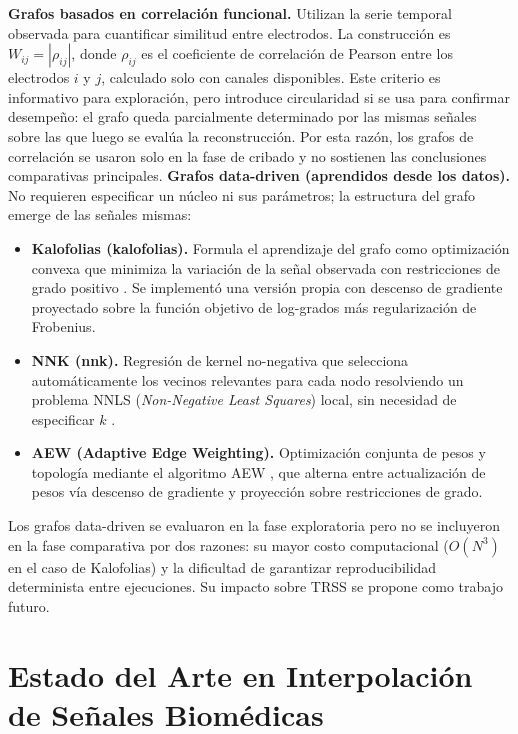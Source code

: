 \textbf{Grafos basados en correlación funcional.} Utilizan la serie temporal observada para cuantificar similitud entre electrodos. La construcción es $W_{ij} = |\rho_{ij}|$, donde $\rho_{ij}$ es el coeficiente de correlación de Pearson entre los electrodos $i$ y $j$, calculado solo con canales disponibles. Este criterio es informativo para exploración, pero introduce circularidad si se usa para confirmar desempeño: el grafo queda parcialmente determinado por las mismas señales sobre las que luego se evalúa la reconstrucción. Por esta razón, los grafos de correlación se usaron solo en la fase de cribado y no sostienen las conclusiones comparativas principales.
\textbf{Grafos data-driven (aprendidos desde los datos).} No requieren especificar un núcleo ni sus parámetros; la estructura del grafo emerge de las señales mismas:

\begin{itemize}[leftmargin=*,itemsep=1pt,topsep=2pt]
\item \textbf{Kalofolias (kalofolias).} Formula el aprendizaje del grafo como optimización convexa que minimiza la variación de la señal observada con restricciones de grado positivo \cite{kalofolias_how_2016}. Se implementó una versión propia con descenso de gradiente proyectado sobre la función objetivo de log-grados más regularización de Frobenius.
\item \textbf{NNK (nnk).} Regresión de kernel no-negativa que selecciona automáticamente los vecinos relevantes para cada nodo resolviendo un problema NNLS (\textit{Non-Negative Least Squares}) local, sin necesidad de especificar $k$ \cite{shekkizhar2020}.
\item \textbf{AEW (Adaptive Edge Weighting).} Optimización conjunta de pesos y topología mediante el algoritmo AEW \cite{shekkizhar2020}, que alterna entre actualización de pesos vía descenso de gradiente y proyección sobre restricciones de grado.
\end{itemize}
Los grafos data-driven se evaluaron en la fase exploratoria pero no se incluyeron en la fase comparativa por dos razones: su mayor costo computacional ($O(N^3)$ en el caso de Kalofolias) y la dificultad de garantizar reproducibilidad determinista entre ejecuciones. Su impacto sobre TRSS se propone como trabajo futuro.

\section{Estado del Arte en Interpolación de Señales Biomédicas}

